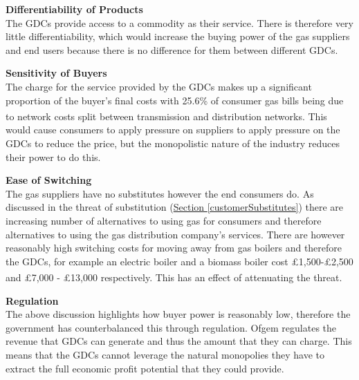 \documentclass[11pt]{article}		%
\newcommand{\supercite}[1]{\textsuperscript{\cite{#1}}}		%
\newcommand{\sectref}[1]{\hyperref[#1]{Section \ref*{#1}}}     %
\begin{document}
                \textbf{Differentiability of Products}%
                \\
                The GDCs provide access to a commodity as their service. There is therefore very little differentiability, which would increase the buying power of the gas suppliers and end users because there is no difference for them between different GDCs.
                
              \textbf{Sensitivity of Buyers}%
              \\
                The charge for the service provided by the GDCs makes up a significant proportion of the buyer’s final costs with 25.6\% of consumer gas bills being due to network costs split between transmission and distribution networks. \supercite{gas_cost} %
                This would cause consumers to apply pressure on suppliers to apply pressure on the GDCs to reduce the price, but the monopolistic nature of the industry reduces their power to do this.
                
                \textbf{Ease of Switching}%
                \\
                The gas suppliers have no substitutes however the end consumers do. As discussed in the threat of substitution (\sectref{customerSubstitutes}) there are increasing number of alternatives to using gas for consumers and therefore alternatives to using the gas distribution company’s services. %
                There are however reasonably high switching costs for moving away from gas boilers and therefore the GDCs, for example an electric boiler and a biomass boiler cost £1,500-£2,500 and £7,000 - £13,000 respectively.\supercite{boiler_cost} This has an effect of attenuating the threat.
                
                \textbf{Regulation}
                \\
                The above discussion highlights how buyer power is reasonably low, therefore the government has counterbalanced this through regulation. Ofgem regulates the revenue that GDCs can generate and thus the amount that they can charge. This means that the GDCs cannot leverage the natural monopolies they have to extract the full economic profit potential that they could provide.
                
\end{document}
